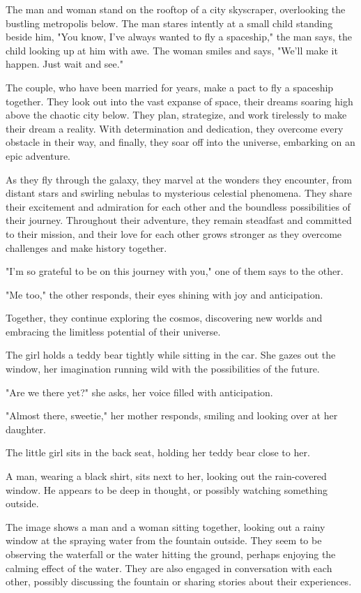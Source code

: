 \documentclass[smalldemyvopaper,11pt,twoside,onecolumn,openright,extrafontsizes]{memoir}
\begin{document}
The man and woman stand on the rooftop of a city skyscraper, overlooking the bustling metropolis below. The man stares intently at a small child standing beside him, "You know, I've always wanted to fly a spaceship," the man says, the child looking up at him with awe. The woman smiles and says, "We'll make it happen. Just wait and see."\par
The couple, who have been married for years, make a pact to fly a spaceship together. They look out into the vast expanse of space, their dreams soaring high above the chaotic city below. They plan, strategize, and work tirelessly to make their dream a reality. With determination and dedication, they overcome every obstacle in their way, and finally, they soar off into the universe, embarking on an epic adventure.\par
As they fly through the galaxy, they marvel at the wonders they encounter, from distant stars and swirling nebulas to mysterious celestial phenomena. They share their excitement and admiration for each other and the boundless possibilities of their journey. Throughout their adventure, they remain steadfast and committed to their mission, and their love for each other grows stronger as they overcome challenges and make history together.\par
"I'm so grateful to be on this journey with you," one of them says to the other.\par
"Me too," the other responds, their eyes shining with joy and anticipation.\par
Together, they continue exploring the cosmos, discovering new worlds and embracing the limitless potential of their universe.\par
The girl holds a teddy bear tightly while sitting in the car. She gazes out the window, her imagination running wild with the possibilities of the future.\par
"Are we there yet?" she asks, her voice filled with anticipation.\par
"Almost there, sweetie," her mother responds, smiling and looking over at her daughter.\par
The little girl sits in the back seat, holding her teddy bear close to her.\par
A man, wearing a black shirt, sits next to her, looking out the rain-covered window. He appears to be deep in thought, or possibly watching something outside.\par
The image shows a man and a woman sitting together, looking out a rainy window at the spraying water from the fountain outside. They seem to be observing the waterfall or the water hitting the ground, perhaps enjoying the calming effect of the water. They are also engaged in conversation with each other, possibly discussing the fountain or sharing stories about their experiences.\par
\end{document}
